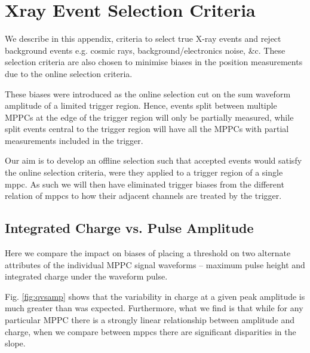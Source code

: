 
\section{Xray Event Selection Criteria}

We describe in this appendix, criteria to select true X-ray events and reject background events e.g. cosmic rays, background/electronics noise, \&c. These selection criteria are also chosen to minimise biases in the position measurements due to the online selection criteria. 

These biases were introduced as the online selection cut on the sum waveform amplitude of a limited trigger region. Hence, events split between multiple MPPCs at the edge of the trigger region will only be partially measured, while split events central to the trigger region will have all the MPPCs with partial measurements included in the trigger. 

Our aim is to develop an offline selection such that accepted events would satisfy the online selection criteria, were they applied to a trigger region of a single mppc. As such we will then have eliminated trigger biases from the different relation of mppcs to how their adjacent channels are treated by the trigger.


\subsection*{Integrated Charge vs. Pulse Amplitude}
Here we compare the impact on biases of placing a threshold on two alternate attributes of the individual MPPC signal waveforms -- maximum pulse height and integrated charge under the waveform pulse. 


Fig. \ref{fig:qvsamp} shows that the variability in charge at a given peak amplitude is much greater than was expected. 
Furthermore, what we find is that while for any particular MPPC there is a strongly linear relationship between amplitude and charge, when we compare between mppcs there are significant disparities in the slope.

